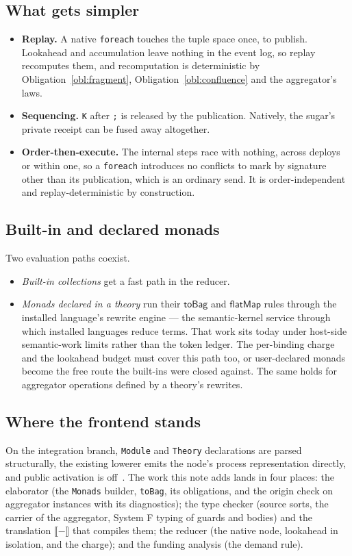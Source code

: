 \documentclass[11pt]{article}
\theoremstyle{definition}
\theoremstyle{plain}
\theoremstyle{remark}
\newcommand{\sem}[1]{\llbracket #1 \rrbracket}
\newcommand{\bind}{\mathsf{flatMap}}
\newcommand{\fe}{\texttt{foreach}}
\begin{document}
\subsection{What gets simpler}

\begin{itemize}[nosep]
\item \textbf{Replay.} A native \fe{} touches the tuple space once, to publish.
Lookahead and accumulation leave nothing in the event log, so replay
recomputes them, and recomputation is deterministic by
Obligation~\ref{obl:fragment}, Obligation~\ref{obl:confluence} and the
aggregator's laws.
\item \textbf{Sequencing.} \texttt{K} after \texttt{;} is released by the
publication. Natively, the sugar's private receipt can be fused away
altogether.
\item \textbf{Order-then-execute.} The internal steps race with nothing, across
deploys or within one, so a \fe{} introduces no conflicts to mark by signature
other than its publication, which is an ordinary send. It is order-independent
and replay-deterministic by construction.
\end{itemize}

\subsection{Built-in and declared monads}

Two evaluation paths coexist.
\begin{itemize}[nosep]
\item \emph{Built-in collections} get a fast path in the reducer.
\item \emph{Monads declared in a theory} run their \(\mathsf{toBag}\) and
\(\bind\) rules through the installed language's rewrite engine --- the
semantic-kernel service through which installed languages reduce terms. That
work sits today under host-side semantic-work limits rather than the token
ledger. The per-binding charge and the lookahead budget must cover this path
too, or user-declared monads become the free route the built-ins were closed
against. The same holds for aggregator operations defined by a theory's
rewrites.
\end{itemize}

\subsection{Where the frontend stands}

On the integration branch, \texttt{Module} and \texttt{Theory} declarations are
parsed structurally, the existing lowerer emits the node's process
representation directly, and public activation is off~\cite{f1r3nodeOTE}. The
work this note adds lands in four places: the elaborator (the \texttt{Monads}
builder, \texttt{toBag}, its obligations, and the origin check on aggregator
instances with its diagnostics); the type checker (source sorts, the carrier of
the aggregator, System F typing of guards and bodies) and the translation
\(\sem{-}\) that compiles them; the reducer (the native node,
lookahead in isolation, and the charge); and the funding analysis (the demand
rule).
\end{document}

